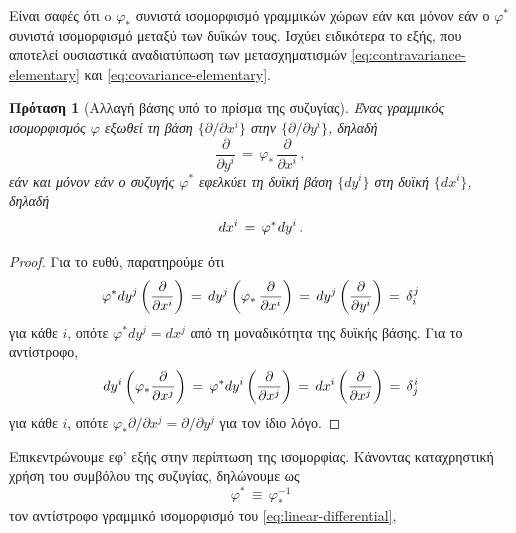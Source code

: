 \documentclass[11pt,a4paper,twoside,openright]{book}
\newtheorem{proposition}[lemma]{Πρόταση}
\begin{document}
Είναι σαφές ότι o $\varphi_*$ συνιστά ισομορφισμό γραμμικών χώρων εάν και μόνον εάν ο $\varphi^*$ συνιστά ισομορφισμό μεταξύ των δυϊκών τους. Ισχύει ειδικότερα το εξής,
που αποτελεί ουσιαστικά αναδιατύπωση των μετασχηματισμών
\eqref{eq:contravariance-elementary} και \eqref{eq:covariance-elementary}.
\begin{proposition}[Αλλαγή βάσης υπό το πρίσμα της συζυγίας]
	\label{prop:change-of-basis-under-adjoint}
Ένας γραμμικός ισομορφισμός $\varphi$
εξωθεί τη βάση $\{\partial/\partial x^i\}$
στην $\{\partial/\partial y^i\}$, δηλαδή
\begin{equation}\label{eq:pushforward-basis}
\frac{\partial}{\partial y^i}
\,=\,
\varphi_*\,\frac{\partial}{\partial x^i}\,,
\end{equation}
εάν και μόνον εάν ο συζυγής $\varphi^*$
εφελκύει τη δυϊκή βάση $\{dy^i\}$
στη δυϊκή $\{dx^i\}$, δηλαδή
\begin{equation}\label{eq:pullback-basis-dual}
dx^{i}
\,=\,
\varphi^*\hspace{.5pt}dy^i\,.
\end{equation}
\end{proposition}
\begin{proof}
Για το ευθύ, παρατηρούμε ότι
\begin{equation*}
\varphi^* dy^j\left(\frac{\partial}{\partial x^i}\right)
\,=\,
dy^j\left(\varphi_*\,\frac{\partial}{\partial x^i}\right)
\,=\,
dy^j\left(\frac{\partial}{\partial y^i}\right)
\,=\,
\delta^{\hspace{.5pt}j}_i
\end{equation*}
για κάθε $i$, οπότε $\varphi^* dy^j = dx^j$
από τη μοναδικότητα της δυϊκής βάσης.
Για το αντίστροφο,
\begin{equation*}
dy^i\left(\varphi_*\frac{\partial}{\partial x^j}\right)
\,=\,
\varphi^* dy^i \left(\frac{\partial}{\partial x^j}\right)
\,=\,
dx^i\left(\frac{\partial}{\partial x^j}\right)
\,=\,
\delta^{\hspace{.5pt}i}_j
\end{equation*}
για κάθε $i$, οπότε $\varphi_* \partial/\partial x^j = \partial/\partial y^j$ για τον ίδιο λόγο.
\end{proof}
\noindent
Επικεντρώνουμε εφ' εξής στην περίπτωση της ισομορφίας.
Κάνοντας καταχρηστική χρήση του συμβόλου της συζυγίας,
δηλώνουμε ως
\begin{equation}\label{eq:inverse-isomorphism}
\varphi^* \,\equiv\, \varphi_*^{-1}
\end{equation}
τον αντίστροφο γραμμικό ισομορφισμό του \eqref{eq:linear-differential},
\end{document}
